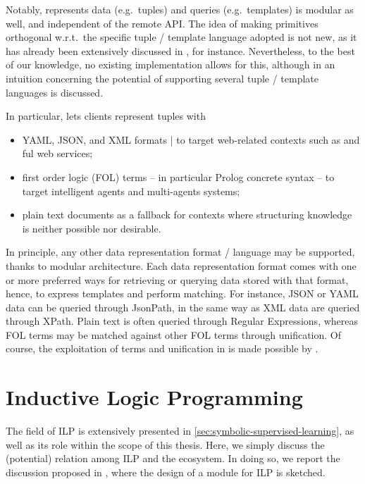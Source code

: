 \documentclass[12pt,a4paper,openright,twoside]{book}
\begin{document}
Notably, \tusow{} represents data (e.g.\ tuples) and queries (e.g.\ templates) is modular as well, and independent of the remote API.
%
The idea of making \linda{} primitives orthogonal w.r.t.\ the specific tuple / template language adopted is not new, as it has already been extensively discussed in \cite{coord-sac99}, for instance.
%
Nevertheless, to the best of our knowledge, no existing implementation allows for this, although in \cite{coordination-woa2017} an intuition concerning the potential of supporting several tuple / template languages is discussed.

In particular, \tusow{} lets clients represent tuples with
%
\begin{itemize}
    \item YAML, JSON, and XML formats | to target web-related contexts such as \soa{} and \rest{}ful web services;
    \item first order logic (FOL) terms -- in particular Prolog concrete syntax -- to target intelligent agents and multi-agents systems;
    \item plain text documents as a fallback for contexts where structuring knowledge is neither possible nor desirable.
\end{itemize}
%
In principle, any other data representation format / language may be supported, thanks to \tusow{} modular architecture.
%
Each data representation format comes with one or more preferred ways for retrieving or querying data stored with that format, hence, to express templates and perform matching.
%
For instance, JSON or YAML data can be queried through JsonPath, in the same way as XML data are queried through XPath.
%
Plain text is often queried through Regular Expressions, whereas FOL terms may be matched against other FOL terms through unification.
%
Of course, the exploitation of terms and unification in \tusow{} is made possible by \twopkt{}.

\section{Inductive Logic Programming}
\label{sec:ilp-speciale}


The field of ILP is extensively presented in \cref{sec:symbolic-supervised-learning}, as well as its role within the scope of this thesis.
%
Here, we simply discuss the (potential) relation among ILP and the \twopkt{} ecosystem.
%
In doing so, we report the discussion proposed in \cite{Speciale2021}, where the design of a \twopkt{} module for ILP is sketched.
\end{document}
